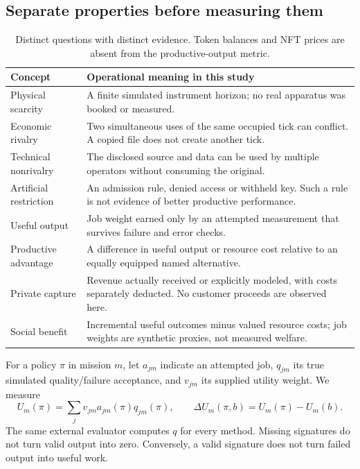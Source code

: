 \documentclass[11pt]{article}
\begin{document}
\subsection{Separate properties before measuring them}
\begin{table}[H]\small\renewcommand{\arraystretch}{1.16}
\begin{tabularx}{\textwidth}{@{}p{}X@{}}\toprule
Concept & Operational meaning in this study\\\midrule
Physical scarcity & A finite simulated instrument horizon; no real apparatus was booked or measured.\\
Economic rivalry & Two simultaneous uses of the same occupied tick can conflict. A copied file does not create another tick.\\
Technical nonrivalry & The disclosed source and data can be used by multiple operators without consuming the original.\\
Artificial restriction & An admission rule, denied access or withheld key. Such a rule is not evidence of better productive performance.\\
Useful output & Job weight earned only by an attempted measurement that survives failure and error checks.\\
Productive advantage & A difference in useful output or resource cost relative to an equally equipped named alternative.\\
Private capture & Revenue actually received or explicitly modeled, with costs separately deducted. No customer proceeds are observed here.\\
Social benefit & Incremental useful outcomes minus valued resource costs; job weights are synthetic proxies, not measured welfare.\\\bottomrule
\end{tabularx}
\caption{Distinct questions with distinct evidence. Token balances and NFT prices are absent from the productive-output metric.}
\end{table}

For a policy $\pi$ in mission $m$, let $a_{jm}$ indicate an attempted job, $q_{jm}$ its true simulated quality/failure acceptance, and $v_{jm}$ its supplied utility weight. We measure
\begin{equation}
U_m(\pi)=\sum_j v_{jm}a_{jm}(\pi)q_{jm}(\pi),\qquad
\Delta U_m(\pi,b)=U_m(\pi)-U_m(b).
\end{equation}
The same external evaluator computes $q$ for every method. Missing signatures do not turn valid output into zero. Conversely, a valid signature does not turn failed output into useful work.
\end{document}
